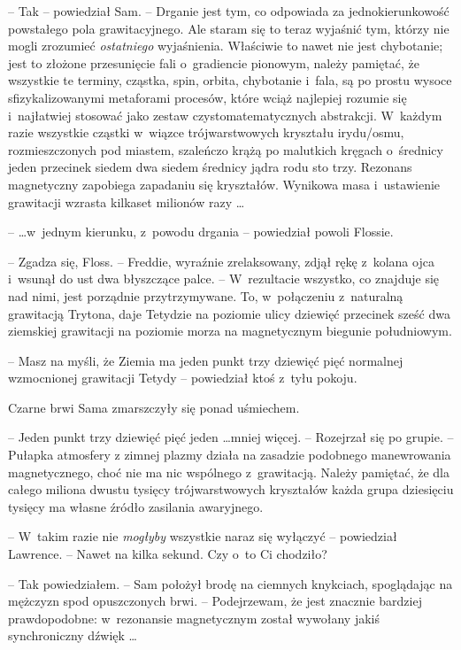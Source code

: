 \documentclass[oneside,polish,11pt,rmheadings]{mwbk}
\begin{document}
-- Tak -- powiedział Sam.  -- Drganie jest tym, co odpowiada za jednokierunkowość powstałego pola grawitacyjnego. Ale staram się to teraz wyjaśnić tym, którzy nie mogli zrozumieć \textit{ostatniego }wyjaśnienia. Właściwie to nawet nie jest chybotanie; jest to złożone przesunięcie fali o~gradiencie pionowym, należy pamiętać, że wszystkie te terminy, cząstka, spin, orbita, chybotanie i~fala, są po prostu wysoce sfizykalizowanymi metaforami procesów, które wciąż najlepiej rozumie się i~najłatwiej stosować jako zestaw czystomatematycznych abstrakcji. W~każdym razie wszystkie cząstki w~wiązce trójwarstwowych kryształu irydu/osmu, rozmieszczonych pod miastem, szaleńczo krążą po malutkich kręgach o~średnicy jeden przecinek siedem dwa siedem średnicy jądra rodu sto trzy.  Rezonans magnetyczny zapobiega zapadaniu się kryształów. Wynikowa masa i~ustawienie grawitacji wzrasta kilkaset milionów razy \ldots  

--  \ldots w~jednym kierunku, z~powodu drgania -- powiedział powoli Flossie. 

-- Zgadza się, Floss. -- Freddie, wyraźnie zrelaksowany, zdjął rękę z~kolana ojca i~wsunął do ust dwa błyszczące palce. -- W~rezultacie wszystko, co znajduje się nad nimi, jest porządnie przytrzymywane. To, w~połączeniu z~naturalną grawitacją Trytona, daje Tetydzie na poziomie ulicy dziewięć przecinek sześć dwa ziemskiej grawitacji na poziomie morza na magnetycznym biegunie południowym. 

-- Masz na myśli, że Ziemia ma jeden punkt trzy dziewięć pięć normalnej wzmocnionej grawitacji Tetydy -- powiedział ktoś z~tyłu pokoju. 

Czarne brwi Sama zmarszczyły się ponad uśmiechem.

 -- Jeden punkt trzy dziewięć pięć jeden  \ldots  mniej więcej. -- Rozejrzał się po grupie. -- Pułapka atmosfery   z zimnej plazmy działa na zasadzie podobnego manewrowania magnetycznego, choć nie ma nic wspólnego z~grawitacją. Należy pamiętać, że dla całego miliona dwustu tysięcy trójwarstwowych kryształów każda grupa dziesięciu tysięcy ma własne źródło zasilania awaryjnego. 

-- W~takim razie nie \textit{mogłyby }wszystkie naraz się wyłączyć -- powiedział Lawrence. -- Nawet na kilka sekund. Czy o~to Ci chodziło? 

-- Tak powiedziałem. -- Sam położył brodę na ciemnych knykciach, spoglądając na mężczyzn spod opuszczonych brwi. -- Podejrzewam, że jest znacznie bardziej prawdopodobne: w~rezonansie magnetycznym został wywołany jakiś synchroniczny dźwięk \ldots  
\end{document}
